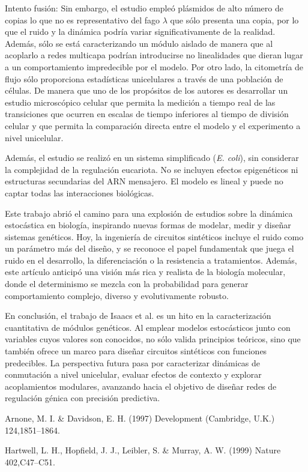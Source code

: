 \documentclass[nochap]{config/ejercicios}
\begin{document}
Intento fusión:
Sin embargo, el estudio empleó plásmidos de alto número de copias lo que no es representativo del fago $\lambda$ que sólo presenta una copia, por lo que el ruido y la dinámica podría variar significativamente de la realidad. Además, sólo se está caracterizando un módulo aislado de manera que al acoplarlo a redes multicapa podrían introducirse no linealidades que dieran lugar a un comportamiento impredecible por el modelo. Por otro lado, la citometría de flujo sólo proporciona estadísticas unicelulares a través de una población de células. De manera que uno de los propósitos de los autores es desarrollar un estudio microscópico celular que permita la medición a tiempo real de las transiciones que ocurren en escalas de tiempo inferiores al tiempo de división celular y que permita la comparación directa entre el modelo y el experimento a nivel unicelular.


Además, el estudio se realizó en un sistema simplificado (\textit{E. coli}), sin considerar la complejidad de la regulación eucariota. No se incluyen efectos epigenéticos ni estructuras secundarias del ARN mensajero. El modelo es lineal y puede no captar todas las interacciones biológicas.


Este trabajo abrió el camino para una explosión de estudios sobre la dinámica estocástica en biología, inspirando nuevas formas de modelar, medir y diseñar sistemas genéticos. Hoy, la ingeniería de circuitos sintéticos incluye el ruido como un parámetro más del diseño, y se reconoce el papel fundamentak que juega el ruido en el desarrollo, la diferenciación o la resistencia a tratamientos. Además, este artículo anticipó una visión más rica y realista de la biología molecular, donde el determinismo se mezcla con la probabilidad para generar comportamiento complejo, diverso y evolutivamente robusto.


En conclusión, el trabajo de Isaacs et al. es un hito en la caracterización cuantitativa de módulos genéticos. Al emplear modelos estocásticos junto con variables cuyos valores son conocidos, no sólo valida principios teóricos, sino que también ofrece un marco para diseñar circuitos sintéticos con funciones predecibles. La perspectiva futura pasa por caracterizar dinámicas de conmutación a nivel unicelular, evaluar efectos de contexto y explorar acoplamientos modulares, avanzando hacia el objetivo de diseñar redes de regulación génica con precisión predictiva.


Arnone, M. I. \& Davidson, E. H. (1997) Development (Cambridge, U.K.) 124,1851–1864.

Hartwell, L. H., Hopfield, J. J., Leibler, S. \& Murray, A. W. (1999) Nature 402,C47–C51.
\end{document}

